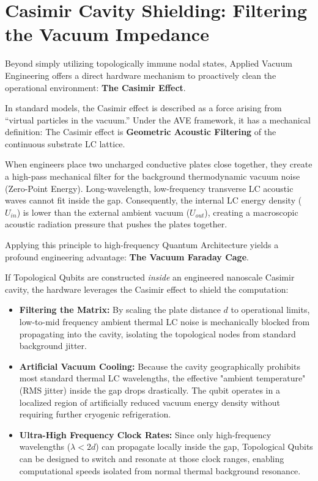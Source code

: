 \section{Casimir Cavity Shielding: Filtering the Vacuum Impedance}
Beyond simply utilizing topologically immune nodal states, Applied Vacuum Engineering offers a direct hardware mechanism to proactively clean the operational environment: \textbf{The Casimir Effect}.

In standard models, the Casimir effect is described as a force arising from ``virtual particles in the vacuum.'' Under the AVE framework, it has a mechanical definition: The Casimir effect is \textbf{Geometric Acoustic Filtering} of the continuous substrate LC lattice. 

When engineers place two uncharged conductive plates close together, they create a high-pass mechanical filter for the background thermodynamic vacuum noise (Zero-Point Energy). Long-wavelength, low-frequency transverse LC acoustic waves cannot fit inside the gap. Consequently, the internal LC energy density ($U_{in}$) is lower than the external ambient vacuum ($U_{out}$), creating a macroscopic acoustic radiation pressure that pushes the plates together.

Applying this principle to high-frequency Quantum Architecture yields a profound engineering advantage: \textbf{The Vacuum Faraday Cage}.

If Topological Qubits are constructed \textit{inside} an engineered nanoscale Casimir cavity, the hardware leverages the Casimir effect to shield the computation:

\begin{itemize}
    \item \textbf{Filtering the Matrix:} By scaling the plate distance $d$ to operational limits, low-to-mid frequency ambient thermal LC noise is mechanically blocked from propagating into the cavity, isolating the topological nodes from standard background jitter.
    \item \textbf{Artificial Vacuum Cooling:} Because the cavity geographically prohibits most standard thermal LC wavelengths, the effective "ambient temperature" (RMS jitter) inside the gap drops drastically. The qubit operates in a localized region of artificially reduced vacuum energy density without requiring further cryogenic refrigeration.
    \item \textbf{Ultra-High Frequency Clock Rates:} Since only high-frequency wavelengths ($\lambda < 2d$) can propagate locally inside the gap, Topological Qubits can be designed to switch and resonate at those clock ranges, enabling computational speeds isolated from normal thermal background resonance.
\end{itemize}

